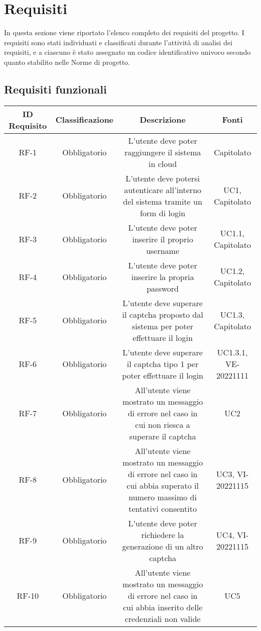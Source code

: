 \section{Requisiti}
In questa sezione viene riportato l'elenco completo dei requisiti del progetto.
I requisiti sono stati individuati e classificati durante l'attività di analisi dei requisiti, e a ciascuno è stato assegnato un codice identificativo univoco secondo quanto stabilito nelle Norme di progetto.

\subsection{Requisiti funzionali}
\begin{tabular}{| c | c | c | c |} 
 \hline
 \textbf{ID Requisito} & \textbf{Classificazione} & \textbf{Descrizione} & \textbf{Fonti} \\
 \hline
 RF-1 & Obbligatorio &  L’utente deve poter raggiungere il sistema in cloud & Capitolato\\
 \hline
  RF-2 & Obbligatorio &  L’utente deve potersi autenticare all’interno del sistema tramite un form di login &  UC1, Capitolato\\
 \hline
 RF-3 & Obbligatorio &  L’utente deve poter inserire il proprio username &  UC1.1, Capitolato\\
 \hline
 RF-4 & Obbligatorio &  L’utente deve poter inserire la propria password &  UC1.2, Capitolato\\
 \hline
 RF-5 & Obbligatorio &  L’utente deve superare il captcha proposto dal sistema per poter effettuare il login &  UC1.3, Capitolato\\
 \hline
 RF-6 & Obbligatorio &  L’utente deve superare il captcha tipo 1 per poter effettuare il login &  UC1.3.1, VE-20221111\\
 \hline
 RF-7 & Obbligatorio & All’utente viene mostrato un messaggio di errore nel caso in cui non riesca a superare il captcha &  UC2\\
 \hline
 RF-8 & Obbligatorio &  All’utente viene mostrato un messaggio di errore nel caso in cui abbia superato il numero massimo di tentativi consentito &  UC3, VI-20221115\\
 \hline
 RF-9 & Obbligatorio &  L’utente deve poter richiedere la generazione di un altro captcha &  UC4, VI-20221115\\
 \hline
 RF-10 & Obbligatorio & All’utente viene mostrato un messaggio di errore nel caso in cui abbia inserito delle credenziali non valide &  UC5\\
 \hline
\end{tabular}

